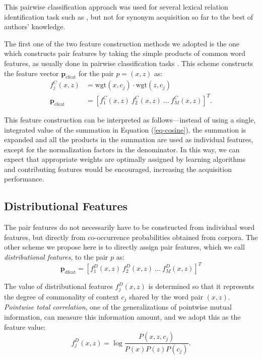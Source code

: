 \documentclass[english]{jnlp_1.4}
\begin{document}
This pairwise classification approach was used for several lexical
relation identification task such as \cite{Bilenko:03,Mirkin:06}, but
not for synonym acquisition so far to the best of authors' knowledge.

The first one of the two feature construction methods we adopted is
the one which constructs pair features by taking the simple products
of common word features, as usually done in pairwise classification
tasks \cite{Bilenko:03}. This scheme constructs the feature vector
$\mathbf{p}_{\mathrm{cfeat}}$ for the pair $p = (x, z)$ as:
\begin{align}
f^C_j(x, z) &= \mathrm{wgt}(x, c_j) \cdot \mathrm{wgt}(z, c_j) \label{eq-prod} \\
\mathbf{p}_{\mathrm{cfeat}} &= [f^C_1(x, z)\ f^C_2(x, z)\ \dots\ f^C_M(x, z)]^T. \label{eq-cfvec}
\end{align}

This feature construction can be interpreted as follows---instead of
using a single, integrated value of the summation in Equation
(\ref{eq-cosine}), the summation is expanded and all the products in
the summation are used as individual features, except for the
normalization factors in the denominator. In this way, we can expect
that appropriate weights are optimally assigned by learning algorithms
and contributing features would be encouraged, increasing the
acquisition performance.


\subsection{Distributional Features}

The pair features do not necessarily have to be constructed from
individual word features, but directly from co-occurrence
probabilities obtained from corpora. The other scheme we propose here
is to directly assign pair features, which we call \textit{distributional
features}, to the pair $p$ as:
\begin{equation}
\mathbf{p}_{\mathrm{dfeat}} = [f^D_1(x, z)\ f^D_2(x, z)\ ...\ f^D_M(x, z)]^T \label{eq-dfvec}
\end{equation}

The value of distributional features $f^D_j(x, z)$ is determined so
that it represents the degree of commonality of context $c_j$ shared
by the word pair $(x, z)$. \textit{Pointwise total correlation}, one of
the generalizations of pointwise mutual information, can measure this
information amount, and we adopt this as the feature value:
\begin{equation}
  f^D_j(x, z) = \log\frac{P(x, z, c_j)}{P(x)P(z)P(c_j)}. \label{eq-df}
\end{equation}
\end{document}
